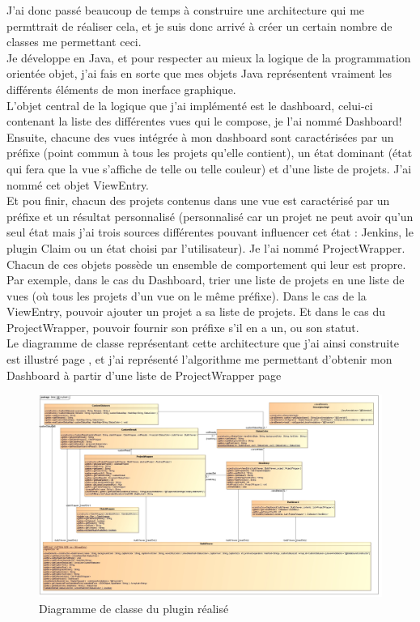 J'ai donc passé beaucoup de temps à construire une architecture qui me permttrait de réaliser cela, et je suis donc arrivé à créer un certain nombre de classes me permettant ceci.\\
Je développe en \gls{Java}, et pour respecter au mieux la logique de la programmation orientée objet, j'ai fais en sorte que mes objets \gls{Java} représentent vraiment les différents éléments de mon inerface graphique.\\
L'objet central de la logique que j'ai implémenté est le dashboard, celui-ci contenant la liste des différentes vues qui le compose, je l'ai nommé Dashboard!\\ Ensuite, chacune des vues intégrée à mon dashboard sont caractérisées par un préfixe (point commun à tous les projets qu'elle contient), un état dominant (état qui fera que la vue s'affiche de telle ou telle couleur) et d'une liste de projets. J'ai nommé cet objet ViewEntry.\\
Et pou finir, chacun des projets contenus dans une vue est caractérisé par un préfixe et un résultat personnalisé (personnalisé car un projet ne peut avoir qu'un seul état mais j'ai trois sources différentes pouvant influencer cet état : Jenkins, le plugin Claim ou un état choisi par l'utilisateur). Je l'ai nommé ProjectWrapper.\\
Chacun de ces objets possède un ensemble de comportement qui leur est propre. Par exemple, dans le cas du Dashboard, trier une liste de projets en une liste de vues (où tous les projets d'un vue on le même préfixe). Dans le cas de la ViewEntry, pouvoir ajouter un projet a sa liste de projets. Et dans le cas du ProjectWrapper, pouvoir fournir son préfixe s'il en a un, ou son statut.\\

Le diagramme de classe représentant cette architecture que j'ai ainsi construite est illustré page \pageref{figure:myDash}, et j'ai représenté l'algorithme me permettant d'obtenir mon Dashboard à partir d'une liste de ProjectWrapper page \pageref{figure:dashboardGenesis}



\begin{figure}[H]
  \centering
      \includegraphics[width=\textheight,angle=90]{images/myDash.jpg}
  \caption{Diagramme de classe du plugin réalisé}
	\label{figure:myDash}
\end{figure}



